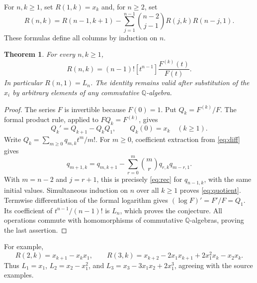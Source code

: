 \documentclass[11pt]{article}
\newtheorem{theorem}{Theorem}
\newcommand{\Q}{\mathbb Q}
\begin{document}
For $n,k\geq1$, set $R(1,k)=x_k$ and, for $n\geq2$, set
\begin{equation}\label{eq:rec}
 R(n,k)=R(n-1,k+1)-\sum_{j=1}^{n-1}
 \binom{n-2}{j-1}R(j,k)R(n-j,1).
\end{equation}
These formulas define all columns by induction on $n$.

\begin{theorem}\label{thm:main}
For every $n,k\geq1$,
\begin{equation}\label{eq:quotient}
 R(n,k)=(n-1)![t^{n-1}]\frac{F^{(k)}(t)}{F(t)}.
\end{equation}
In particular $R(n,1)=L_n$. The identity remains valid after
substitution of the $x_i$ by arbitrary elements of any commutative
$\Q$-algebra.
\end{theorem}
\begin{proof}
The series $F$ is invertible because $F(0)=1$. Put $Q_k=F^{(k)}/F$.
The formal product rule, applied to $FQ_k=F^{(k)}$, gives
\begin{equation}\label{eq:diff}
 Q_k'=Q_{k+1}-Q_kQ_1,\qquad Q_k(0)=x_k\quad(k\geq1).
\end{equation}
Write $Q_k=\sum_{m\geq0}q_{m,k}t^m/m!$. For $m\geq0$,
coefficient extraction from \eqref{eq:diff} gives
\[
 q_{m+1,k}=q_{m,k+1}-\sum_{r=0}^m\binom mr q_{r,k}q_{m-r,1}.
\]
With $m=n-2$ and $j=r+1$, this is precisely \eqref{eq:rec}
for $q_{n-1,k}$, with the same initial values. Simultaneous induction
on $n$ over all $k\geq1$ proves \eqref{eq:quotient}.
Termwise differentiation of the formal logarithm gives
$(\log F)'=F'/F=Q_1$. Its coefficient of $t^{n-1}/(n-1)!$
is $L_n$, which proves the conjecture. All operations commute with
homomorphisms of commutative $\Q$-algebras, proving the last assertion.
\end{proof}

For example,
\[
 R(2,k)=x_{k+1}-x_kx_1,\qquad
 R(3,k)=x_{k+2}-2x_1x_{k+1}+2x_1^2x_k-x_2x_k.
\]
Thus $L_1=x_1$, $L_2=x_2-x_1^2$, and
$L_3=x_3-3x_1x_2+2x_1^3$, agreeing with the source examples.
\end{document}
